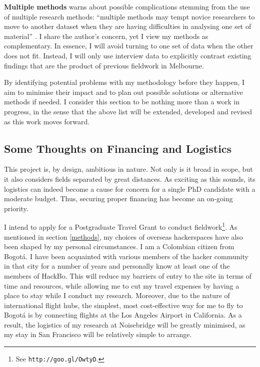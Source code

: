 \begin{list}{}{\leftmargin=0em}
\item[] \textbf{Multiple methods} \citeauthor{silverman00} warns about possible complications stemming from the use of multiple research methods: ``multiple methods may tempt novice researchers to move to another dataset when they are having difficulties in analysing one set of material'' \citep[p.134]{silverman00}. I share the author's concern, yet I view my methods as complementary. In essence, I will avoid turning to one set of data when the other does not fit. Instead, I will only use interview data to explicitly contrast existing findings that are the product of previous fieldwork in Melbourne.

\end{list}

By identifying potential problems with my methodology before they happen, I aim to minimise their impact and to plan out possible solutions or alternative methods if needed. I consider this section to be nothing more than a work in progress, in the sense that the above list will be extended, developed and revised as this work moves forward. 


\subsection{Some Thoughts on Financing and Logistics}
\label{budget}

This project is, by design, ambitious in nature. Not only is it broad in scope, but it also considers fields separated by great distances. As exciting as this sounds, its logistics can indeed become a cause for concern for a single PhD candidate with a moderate budget. Thus, securing proper financing has become an on-going priority. 

I intend to apply for a Postgraduate Travel Grant to conduct fieldwork\footnote{See \texttt{http://goo.gl/OwtyD}.}. As mentioned in section \ref{methods}, my choices of overseas hackerspaces have also been shaped by my personal circumstances. I am a Colombian citizen from Bogot\'{a}. I have been acquainted with various members of the hacker community in that city for a number of years and personally know at least one of the members of HackBo. This will reduce my barriers of entry to the site in terms of time and resources, while allowing me to cut my travel expenses by having a place to stay while I conduct my research. Moreover, due to the nature of international flight hubs, the simplest, most cost-effective way for me to fly to Bogot\'{a} is by connecting flights at the Los Angeles Airport in California. As a result, the logistics of my research at Noisebridge will be greatly minimised, as my stay in San Francisco will be relatively simple to arrange.

